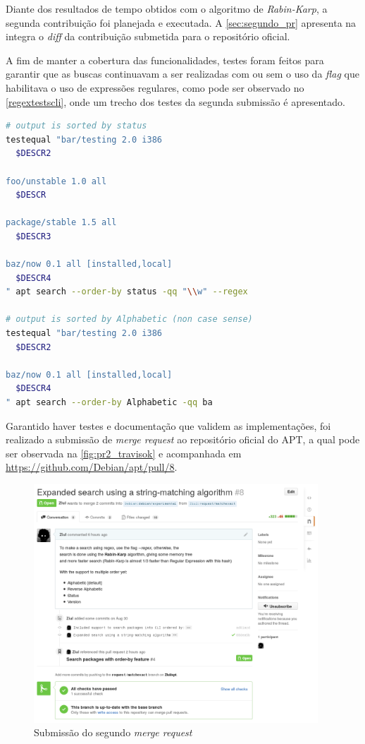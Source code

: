Diante dos resultados de tempo obtidos com o algoritmo de \textit{Rabin-Karp}, a segunda contribuição foi planejada e executada. A \autoref{sec:segundo_pr} apresenta na integra o \textit{diff} da contribuição submetida para o repositório oficial.


A fim de manter a cobertura das funcionalidades, testes foram feitos para garantir que as buscas continuavam a ser realizadas com ou sem o uso da \textit{flag} que habilitava o uso de expressões regulares, como pode ser observado no \autoref{regextestscli}, onde um trecho dos testes da segunda submissão é apresentado.

\begin{lstlisting}[language=Bash,label=regextestscli,caption={Teste com e sem o uso de expressões regulares}]
# output is sorted by status
testequal "bar/testing 2.0 i386
  $DESCR2

foo/unstable 1.0 all
  $DESCR

package/stable 1.5 all
  $DESCR3

baz/now 0.1 all [installed,local]
  $DESCR4
" apt search --order-by status -qq "\\w" --regex

# output is sorted by Alphabetic (non case sense)
testequal "bar/testing 2.0 i386
  $DESCR2

baz/now 0.1 all [installed,local]
  $DESCR4
" apt search --order-by Alphabetic -qq ba
\end{lstlisting}

Garantido haver testes e documentação que validem as implementações, foi realizado a submissão de \textit{merge request} ao repositório oficial do APT, a qual pode ser observada na \autoref{fig:pr2_travisok} e acompanhada em \url{https://github.com/Debian/apt/pull/8}.

\begin{figure}[h]
  \centering
	\includegraphics[width=0.95\textwidth]{figuras/pr2}
  \caption{Submissão do segundo \textit{merge request}}
  \label{fig:pr2_travisok}
\end{figure}

